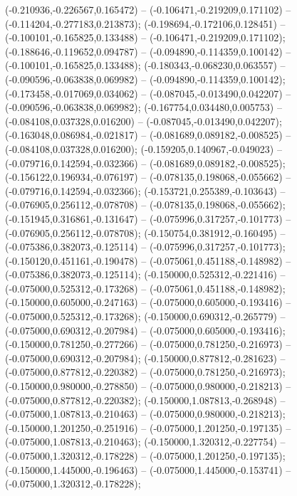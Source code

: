  (-0.210936,-0.226567,0.165472) -- (-0.106471,-0.219209,0.171102) -- (-0.114204,-0.277183,0.213873);
 (-0.198694,-0.172106,0.128451) -- (-0.100101,-0.165825,0.133488) -- (-0.106471,-0.219209,0.171102);
 (-0.188646,-0.119652,0.094787) -- (-0.094890,-0.114359,0.100142) -- (-0.100101,-0.165825,0.133488);
 (-0.180343,-0.068230,0.063557) -- (-0.090596,-0.063838,0.069982) -- (-0.094890,-0.114359,0.100142);
 (-0.173458,-0.017069,0.034062) -- (-0.087045,-0.013490,0.042207) -- (-0.090596,-0.063838,0.069982);
 (-0.167754,0.034480,0.005753) -- (-0.084108,0.037328,0.016200) -- (-0.087045,-0.013490,0.042207);
 (-0.163048,0.086984,-0.021817) -- (-0.081689,0.089182,-0.008525) -- (-0.084108,0.037328,0.016200);
 (-0.159205,0.140967,-0.049023) -- (-0.079716,0.142594,-0.032366) -- (-0.081689,0.089182,-0.008525);
 (-0.156122,0.196934,-0.076197) -- (-0.078135,0.198068,-0.055662) -- (-0.079716,0.142594,-0.032366);
 (-0.153721,0.255389,-0.103643) -- (-0.076905,0.256112,-0.078708) -- (-0.078135,0.198068,-0.055662);
 (-0.151945,0.316861,-0.131647) -- (-0.075996,0.317257,-0.101773) -- (-0.076905,0.256112,-0.078708);
 (-0.150754,0.381912,-0.160495) -- (-0.075386,0.382073,-0.125114) -- (-0.075996,0.317257,-0.101773);
 (-0.150120,0.451161,-0.190478) -- (-0.075061,0.451188,-0.148982) -- (-0.075386,0.382073,-0.125114);
 (-0.150000,0.525312,-0.221416) -- (-0.075000,0.525312,-0.173268) -- (-0.075061,0.451188,-0.148982);
 (-0.150000,0.605000,-0.247163) -- (-0.075000,0.605000,-0.193416) -- (-0.075000,0.525312,-0.173268);
 (-0.150000,0.690312,-0.265779) -- (-0.075000,0.690312,-0.207984) -- (-0.075000,0.605000,-0.193416);
 (-0.150000,0.781250,-0.277266) -- (-0.075000,0.781250,-0.216973) -- (-0.075000,0.690312,-0.207984);
 (-0.150000,0.877812,-0.281623) -- (-0.075000,0.877812,-0.220382) -- (-0.075000,0.781250,-0.216973);
 (-0.150000,0.980000,-0.278850) -- (-0.075000,0.980000,-0.218213) -- (-0.075000,0.877812,-0.220382);
 (-0.150000,1.087813,-0.268948) -- (-0.075000,1.087813,-0.210463) -- (-0.075000,0.980000,-0.218213);
 (-0.150000,1.201250,-0.251916) -- (-0.075000,1.201250,-0.197135) -- (-0.075000,1.087813,-0.210463);
 (-0.150000,1.320312,-0.227754) -- (-0.075000,1.320312,-0.178228) -- (-0.075000,1.201250,-0.197135);
 (-0.150000,1.445000,-0.196463) -- (-0.075000,1.445000,-0.153741) -- (-0.075000,1.320312,-0.178228);
